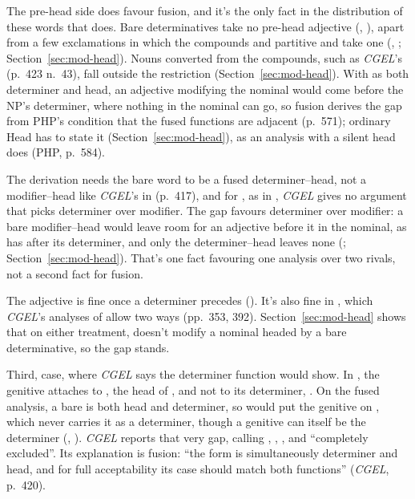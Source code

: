 The pre-head side does favour fusion, and it's the only fact in the distribution of these words that does. Bare determinatives take no pre-head adjective (, ), apart from a few exclamations in which the compounds and partitive  and  take one (, ; Section~\ref{sec:mod-head}). Nouns converted from the compounds, such as \textit{CGEL}'s  (p.~423 n.~43), fall outside the restriction (Section~\ref{sec:mod-head}). With  as both determiner and head, an adjective modifying the nominal would come before the NP's determiner, where nothing in the nominal can go, so fusion derives the gap from PHP's condition that the fused functions are adjacent (p.~571); ordinary Head has to state it (Section~\ref{sec:mod-head}), as an analysis with a silent head does (PHP, p.~584).

The derivation needs the bare word to be a fused determiner--head, not a modifier--head like \textit{CGEL}'s  in  (p.~417), and for , as in , \textit{CGEL} gives no argument that picks determiner over modifier. The gap favours determiner over modifier: a bare modifier--head would leave room for an adjective before it in the nominal, as  has after its determiner, and only the determiner--head leaves none (; Section~\ref{sec:mod-head}). That's one fact favouring one analysis over two rivals, not a second fact for fusion.

The adjective is fine once a determiner precedes (). It's also fine in , which \textit{CGEL}'s analyses of  allow two ways (pp.~353, 392). Section~\ref{sec:mod-head} shows that on either treatment,  doesn't modify a nominal headed by a bare determinative, so the gap stands.

Third, case, where \textit{CGEL} says the determiner function would show. In , the genitive  attaches to , the head of , and not to its determiner, . On the fused analysis, a bare  is both head and determiner, so  would put the genitive on , which never carries it as a determiner, though a genitive can itself be the determiner (, ). \textit{CGEL} reports that very gap, calling , , , and  \enquote{completely excluded}. Its explanation is fusion: \enquote{the form is simultaneously determiner and head, and for full acceptability its case should match both functions} (\textit{CGEL}, p.~420).


